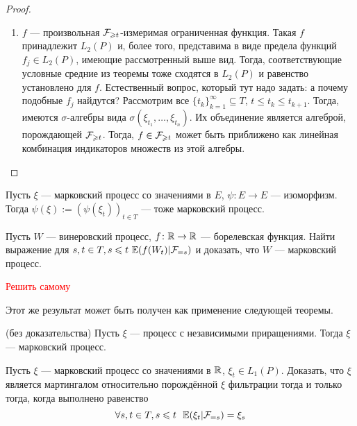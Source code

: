 \begin{proof}
\begin{itemize}
\begin{enumerate}
			\item $f$ --- произвольная $\mathcal{F}_{\geqslant t}$-измеримая ограниченная функция. Такая $f$ принадлежит $L_2(P)$ и, более того, представима в виде предела функций $f_j \in L_2(P)$, имеющие рассмотренный выше вид. Тогда, соответствующие условные средние из теоремы тоже сходятся в $L_2(P)$ и равенство установлено для $f$. Естественный вопрос, который тут надо задать: а почему подобные $f_j$ найдутся? Рассмотрим все $\{t_k\}_{k = 1}^\infty \subseteq T$, $t \le t_k \le t_{k + 1}$. Тогда, имеются $\sigma$-алгебры вида $\sigma(\xi_{t_1}, \ldots, \xi_{t_n})$. Их объединение является алгеброй, порождающей $\mathcal{F}_{\geqslant t}$. Тогда, $f \in \mathcal{F}_{\geqslant t}$ может быть приближено как линейная комбинация индикаторов множеств из этой алгебры.
		\end{enumerate}
	\end{itemize}
\end{proof}

\begin{corollary}
	Пусть $\xi$ --- марковский процесс со значениями в $E$, $\psi \colon E \to E$ --- изоморфизм. Тогда $\psi(\xi) := (\psi(\xi_t))_{t \in T}$ --- тоже марковский процесс.
\end{corollary}

\begin{problem}
	Пусть $W$ --- винеровский процесс, $f \colon \mathbb{R} \to \mathbb{R}$ --- борелевская функция. Найти выражение для $s, t \in T, s \leqslant t\ \mathbb{E}(f(W_t) | \mathcal{F}_{= s})$ и доказать, что $W$ --- марковский процесс.
\end{problem}

\begin{solution}
	\textcolor{red}{Решить самому}
\end{solution}

\begin{note}
	Этот же результат может быть получен как применение следующей теоремы.
\end{note}

\begin{theorem} (без доказательства)
	Пусть $\xi$ --- процесс с независимыми приращениями. Тогда $\xi$ --- марковский процесс.
\end{theorem}

\begin{problem}
	Пусть $\xi$ --- марковский процесс со значениями в $\mathbb{R}$, $\xi_t \in L_1(P)$. Доказать, что $\xi$ является мартингалом относительно порождённой $\xi$ фильтрации тогда и только тогда, когда выполнено равенство
	\[
		\forall s, t \in T, s \leqslant t\ \ \mathbb{E}(\xi_t | \mathcal{F}_{= s}) = \xi_s
	\]
\end{problem}


